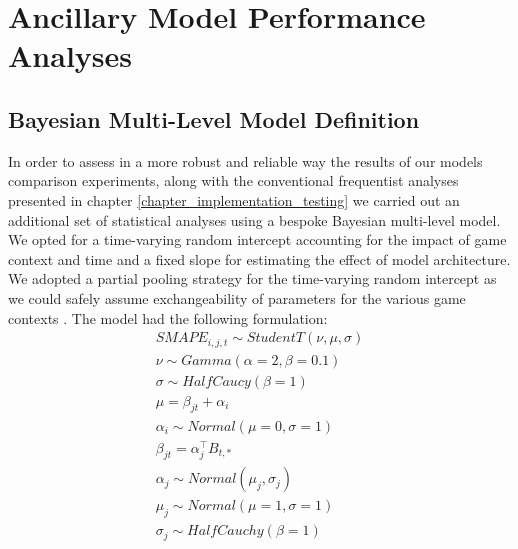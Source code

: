 \chapter{Ancillary Model Performance Analyses}
\label{appendix_ancillary_perf}

\section{Bayesian Multi-Level Model Definition}
\label{bayesian_multilevel_model}
In order to assess in a more robust and reliable way the results of our models comparison experiments, along with the conventional frequentist analyses presented in chapter \ref{chapter_implementation_testing} we carried out an additional set of statistical analyses using a bespoke Bayesian multi-level model. We opted for a time-varying random intercept accounting for the impact of game context and time and a fixed slope for estimating the effect of model architecture. We adopted a partial pooling strategy for the time-varying random intercept as we could safely assume exchangeability of parameters for the various game contexts \cite{gelman2020bayesian}. The model had the following formulation:
\begin{gather}
    \label{bayesian_mlm}
    SMAPE_{i, j, t} \sim StudentT(\nu, \mu, \sigma) \\ \nonumber
    \nu \sim Gamma(\alpha=2, \beta=0.1) \\ \nonumber
    \sigma \sim HalfCaucy(\beta=1)  \\ \nonumber
    \mu = \beta_{jt} + \alpha_{i}  \\ \nonumber
    \alpha_{i} \sim Normal(\mu=0, \sigma=1)  \\ \nonumber
    \beta_{jt} = \alpha_{j}^\top B_{t,*} \\ \nonumber
    \alpha_{j} \sim Normal(\mu_j, \sigma_j) \\ \nonumber
    \mu_j \sim Normal(\mu=1, \sigma=1) \\ \nonumber
    \sigma_j \sim HalfCauchy(\beta=1) \\ \nonumber
\end{gather}
